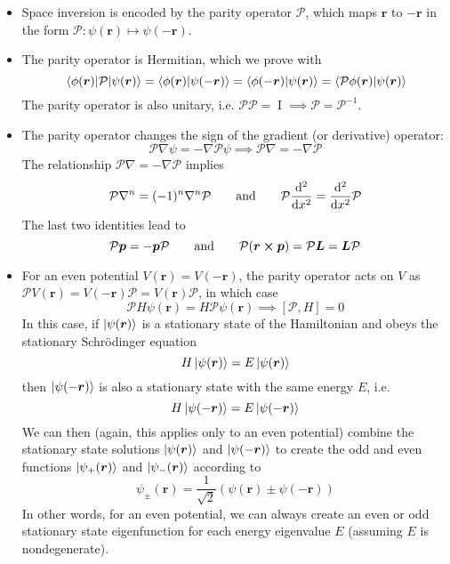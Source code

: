 \documentclass[11pt, a4paper]{article}
\renewcommand{\grad}{\nabla}
\newcommand{\eqtext}[1]{\qquad \text{#1} \qquad}
\newcommand{\Schro}{Schr\"{o}dinger\xspace}
\newcommand{\Ham}{Hamiltonian\xspace}
\newcommand{\Herm}{Hermitian\xspace}
\renewcommand{\vec}[1]{\bm{#1}}  %
\renewcommand{\r}{\vec{r}}  %
\newcommand{\II}{\operatorname{I}}  %
\newcommand{\Par}{\mathcal{P}}  %
\newcommand{\p}{\psi}  %
\renewcommand{\k}[1]{\ket{#1}}
\begin{document}
\begin{itemize}
	\item Space inversion is encoded by the parity operator $ \Par $, which maps $ \r $ to $ -\r $ in the form $ \Par:\p(\r) \mapsto \p(-\r) $.
	
	\item The parity operator is \Herm, which we prove with
	\begin{equation*}
		\mel{\phi(\r)}{\Par}{\p(\r)} = \braket{\phi(\r)}{\p(-\r)} = \braket{\phi(-\r)}{\p(\r)} = \braket{\Par \phi(\r)}{\p(\r)}
	\end{equation*}
	The parity operator is also unitary, i.e. $ \Par \Par = \II \implies \Par = \Par^{-1} $.

	\item The parity operator changes the sign of the gradient (or derivative) operator:
	\begin{equation*}
		\Par \grad \p = - \grad \Par \psi \implies \Par \grad = - \grad \Par
	\end{equation*}
	The relationship $ \Par \grad = - \grad \Par $ implies
	\begin{equation*}
		\Par \grad^{n} = (-1)^{n}\grad^{n} \Par \eqtext{and} \Par \dv[2]{}{x} = \dv[2]{}{x} \Par
	\end{equation*}
	The last two identities lead to
	\begin{equation*}
		\Par \vec{p} = - \vec{p} \Par \eqtext{and} \Par (\r \cross \vec{p}) = \Par \vec{L} = \vec{L} \Par 
	\end{equation*}
	
	\item For an even potential $ V(\r) = V(-\r) $, the parity operator acts on $ V $ as $ \Par V(\r) = V(-\r)\Par = V(\r)\Par $, in which case
	\begin{equation*}
		\Par H\p(\r) = H \Par \p(\r) \implies [\Par, H] = 0
	\end{equation*}
	In this case, if $ \ket{\p(\r)} $ is a stationary state of the \Ham and obeys the stationary \Schro equation
	\begin{equation*}
		H\k{\p(\r)} = E \ket{\p(\r)}
	\end{equation*}
	then $ \ket{\p(-\r)} $ is also a stationary state with the same energy $ E $, i.e.
	\begin{equation*}
		H\k{\p(-\r)} = E \ket{\p(-\r)}
	\end{equation*}
	We can then (again, this applies only to an even potential) combine the stationary state solutions $  \ket{\p(\r)} $ and $ \ket{\p(-\r)} $ to create the odd and even functions $  \ket{\p_{+}(\r)} $ and $ \k{\p_{-}(\r)} $ according to
	\begin{equation*}
		\p_{\pm}(\r) = \frac{1}{\sqrt{2}}\left(\p(\r) \pm \p(-\r)\right)
	\end{equation*}
	In other words, for an even potential, we can always create an even or odd stationary state eigenfunction for each energy eigenvalue $ E $ (assuming $ E $ is nondegenerate).
	

\end{itemize}
\end{document}
